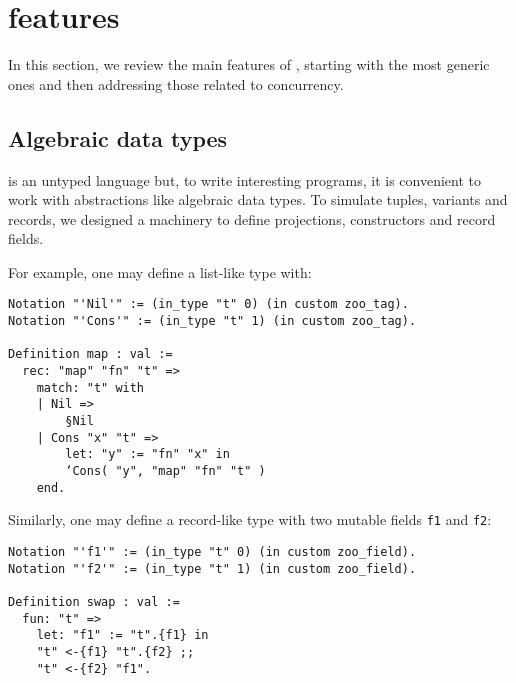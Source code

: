 \section{\Zoo features}
\label{sec:features}

In this section, we review the main features of \Zoo, starting with the most generic ones and then addressing those related to concurrency.

\subsection{Algebraic data types}

\Zoo is an untyped language but, to write interesting programs, it is convenient to work with abstractions like algebraic data types.
To simulate tuples, variants and records, we designed a machinery to define projections, constructors and record fields.

For example, one may define a list-like type with:

\begin{verbatim}
Notation "'Nil'" := (in_type "t" 0) (in custom zoo_tag).
Notation "'Cons'" := (in_type "t" 1) (in custom zoo_tag).

Definition map : val :=
  rec: "map" "fn" "t" =>
    match: "t" with
    | Nil =>
        §Nil
    | Cons "x" "t" =>
        let: "y" := "fn" "x" in
        ‘Cons( "y", "map" "fn" "t" )
    end.
\end{verbatim}

Similarly, one may define a record-like type with two mutable fields \texttt{f1} and \texttt{f2}:

\begin{verbatim}
Notation "'f1'" := (in_type "t" 0) (in custom zoo_field).
Notation "'f2'" := (in_type "t" 1) (in custom zoo_field).

Definition swap : val :=
  fun: "t" =>
    let: "f1" := "t".{f1} in
    "t" <-{f1} "t".{f2} ;;
    "t" <-{f2} "f1".
\end{verbatim}

%

